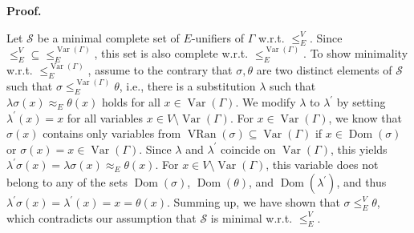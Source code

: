 \documentclass[10pt,a4paper]{amsart}
\begin{document}
 
\par\medskip\noindent\textbf{Proof.}\par
 
 
Let $\mathcal{S}$ be a minimal complete set of $E$-unifiers of $\Gamma$ w.r.t. $\leq_{E}^{V}$. Since ${\leq_{E}^{V}}\subseteq{\leq_{E}^{\operatorname{Var}(\Gamma)}}$, this set is also complete w.r.t. $\leq_{E}^{\operatorname{Var}(\Gamma)}$. To show minimality w.r.t. $\leq_{E}^{\operatorname{Var}(\Gamma)}$, assume to the contrary that $\sigma,\theta$ are two distinct elements of $\mathcal{S}$ such that $\sigma\leq_{E}^{\operatorname{Var}(\Gamma)}\theta$, i.e., there is a substitution $\lambda$ such that $\lambda\sigma(x)\approx_{E}\theta(x)$ holds for all $x\in\operatorname{Var}(\Gamma)$. We modify $\lambda$ to $\lambda^{\prime}$ by setting $\lambda^{\prime}(x)=x$ for all variables $x\in V\setminus\operatorname{Var}(\Gamma)$. For $x\in\operatorname{Var}(\Gamma)$, we know that $\sigma(x)$ contains only variables from $\operatorname{VRan}(\sigma)\subseteq\operatorname{Var}(\Gamma)$ if $x\in\operatorname{Dom}(\sigma)$ or $\sigma(x)=x\in\operatorname{Var}(\Gamma)$. Since $\lambda$ and $\lambda^{\prime}$ coincide on $\operatorname{Var}(\Gamma)$, this yields $\lambda^{\prime}\sigma(x)=\lambda\sigma(x)\approx_{E}\theta(x)$. For $x\in V\setminus\operatorname{Var}(\Gamma)$, this variable does not belong to any of the sets $\operatorname{Dom}(\sigma)$, $\operatorname{Dom}(\theta)$, and $\operatorname{Dom}(\lambda^{\prime})$, and thus $\lambda^{\prime}\sigma(x)=\lambda^{\prime}(x)=x=\theta(x)$. Summing up, we have shown that $\sigma\leq_{E}^{V}\theta$, which contradicts our assumption that $\mathcal{S}$ is minimal w.r.t. $\leq_{E}^{V}$.\par
 
 
 
\end{document}
